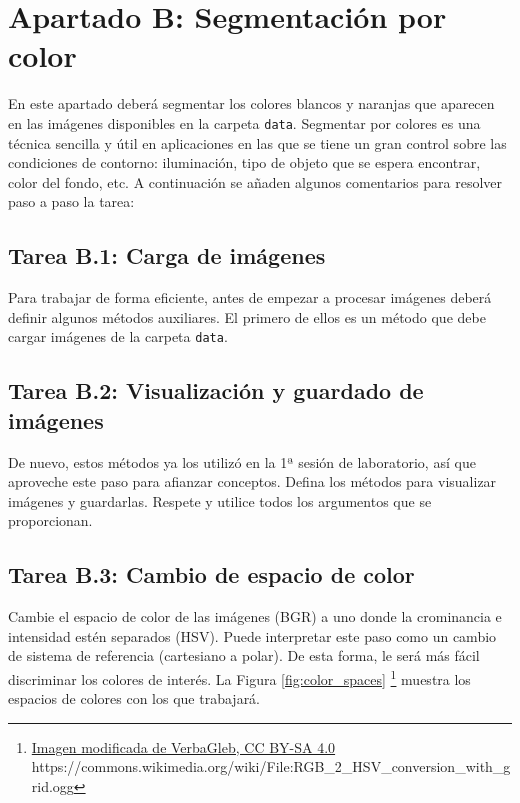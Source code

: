 \chapter{Apartado B: \textbf{Segmentación por color}}
\label{chapter:tarea_b}

En este apartado deberá segmentar los colores blancos y naranjas que aparecen en las imágenes disponibles en la carpeta \texttt{data}. Segmentar por colores es una técnica sencilla y útil en aplicaciones en las que se tiene un gran control sobre las condiciones de contorno: iluminación, tipo de objeto que se espera encontrar, color del fondo, etc. A continuación se añaden algunos comentarios para resolver paso a paso la tarea:

\section*{Tarea B.1: Carga de imágenes}
{}

Para trabajar de forma eficiente, antes de empezar a procesar imágenes deberá definir algunos métodos auxiliares. El primero de ellos es un método que debe cargar imágenes de la carpeta \texttt{data}.

\section*{Tarea B.2: Visualización y guardado de imágenes}

De nuevo, estos métodos ya los utilizó en la 1ª sesión de laboratorio, así que aproveche este paso para afianzar conceptos. Defina los métodos para visualizar imágenes y guardarlas. Respete y utilice todos los argumentos que se proporcionan.

\section*{Tarea B.3: Cambio de espacio de color}

Cambie el espacio de color de las imágenes (BGR) a uno donde la crominancia e intensidad estén separados (HSV). Puede interpretar este paso como un cambio de sistema de referencia (cartesiano a polar). De esta forma, le será más fácil discriminar los colores de interés. La Figura \ref{fig:color_spaces} \footnote{ \href{https://commons.wikimedia.org/wiki/File:RGB\_2\_HSV\_conversion\_with\_grid.ogg}{Imagen modificada de VerbaGleb, CC BY-SA 4.0} https://commons.wikimedia.org/wiki/File:RGB\_2\_HSV\_conversion\_with\_grid.ogg} muestra los espacios de colores con los que trabajará.

